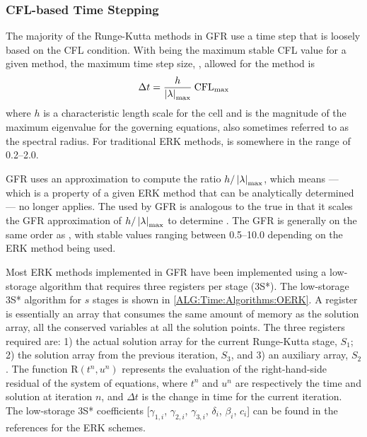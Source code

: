 \subsubsection{CFL-based Time Stepping}
\label{SEC:Time:Algorithms:CFL}


The majority of the Runge-Kutta methods in GFR use a time step that is loosely
based on the CFL condition.
%
With \CFLmax{} being the maximum stable CFL value for a given method, the
maximum time step size, \dt, allowed for the method is
%
\[ \Delta t = \frac{h}{\left|\lambda\right|_\text{max}}\:\text{CFL}_\text{max} \]
%
where $h$ is a characteristic length scale for the cell and \eigmax{} is the
magnitude of the maximum eigenvalue for the governing equations, also sometimes
referred to as the spectral radius.
%
For traditional ERK methods, \CFLmax{} is somewhere in the range of 0.2--2.0.


GFR uses an approximation to compute the ratio $h/\left|\lambda\right|_\text{max}$, which means
\CFLmax{} --- which is a property of a given ERK method that can be analytically
determined --- no longer applies.
%
The  used by GFR is analogous to the true \CFLmax{}
in that it scales the GFR approximation of $h/\left|\lambda\right|_\text{max}$ to determine \dt.
%
The GFR  is generally on the same order as \CFLmax, with stable
values ranging between 0.5--10.0 depending on the ERK method being used.


Most ERK methods implemented in GFR have been implemented using a low-storage
algorithm that requires three registers per stage (3S*).\cite{Ketcheson_2010}
%
The low-storage 3S* algorithm for $s$ stages is shown in
\cref{ALG:Time:Algorithms:OERK}.
%
%
%
A register is essentially an array that consumes the same amount of memory as
the solution array, \thatis all the conserved variables at all the solution
points.
%
The three registers required are: 1) the actual solution array for the current
Runge-Kutta stage, $S_1$; 2) the solution array from the previous iteration,
$S_3$, and 3) an auxiliary array, $S_2$.
%
The function $\bm{\mathrm{R}}\left(t^n,u^n\right)$ represents the evaluation of
the right-hand-side residual of the system of equations, where $t^n$ and $u^n$
are respectively the time and solution at iteration $n$, and $\Delta t$ is the
change in time for the current iteration.
%
The low-storage 3S* coefficients [$\gamma_{1,i}$, $\gamma_{2,i}$,
$\gamma_{3,i}$, $\delta_i$, $\beta_i$, $c_i$] can be found in the references for
the ERK schemes.

